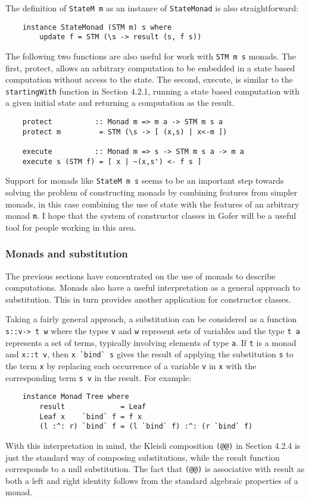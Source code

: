The definition of \verb"StateM m" as an instance of \verb"StateMonad" is also
straightforward:
\begin{verbatim}
    instance StateMonad (STM m) s where
        update f = STM (\s -> result (s, f s))
\end{verbatim}
The following two functions are also useful for work with \verb"STM m s"
monads.  The first, protect, allows an arbitrary computation to be
embedded in a state based computation without access to the state.
The second, execute, is similar to the \verb"startingWith" function in
Section 4.2.1, running a state based computation with a given initial
state and returning a computation as the result.
\begin{verbatim}
    protect          :: Monad m => m a -> STM m s a
    protect m         = STM (\s -> [ (x,s) | x<-m ])

    execute          :: Monad m => s -> STM m s a -> m a
    execute s (STM f) = [ x | ~(x,s') <- f s ]
\end{verbatim}
Support for monads like \verb"StateM m s" seems to be an important step
towards solving the problem of constructing monads by combining
features from simpler monads, in this case combining the use of state
with the features of an arbitrary monad \verb"m".  I hope that the system of
constructor classes in Gofer will be a useful tool for people working
in this area.


\subsubsection{Monads and substitution}
The previous sections have concentrated on the use of monads to
describe computations.  Monads also have a useful interpretation as a
general approach to substitution.  This in turn provides another
application for constructor classes.

Taking a fairly general approach, a substitution can be considered as a
function \verb"s::v-> t w" where the types \verb"v" and \verb"w"
represent sets of variables and the type \verb"t a" represents a set
of terms, typically involving elements of type \verb"a".  If \verb"t" is
a monad and \verb"x::t v", then \verb"x `bind` s" gives the result of
applying the substitution \verb"s" to the term \verb"x" by replacing
each occurrence of a variable \verb"v" in \verb"x" with the corresponding
term \verb"s v" in the result.  For example:
\begin{verbatim}
    instance Monad Tree where
        result             = Leaf
        Leaf x    `bind` f = f x
        (l :^: r) `bind` f = (l `bind` f) :^: (r `bind` f)
\end{verbatim}
With this interpretation in mind, the Kleisli composition \verb"(@@)" in
Section 4.2.4 is just the standard way of composing substitutions,
while the result function corresponds to a null substitution.  The fact
that \verb"(@@)" is associative with result as both a left and right identity
follows from the standard algebraic properties of a monad.


